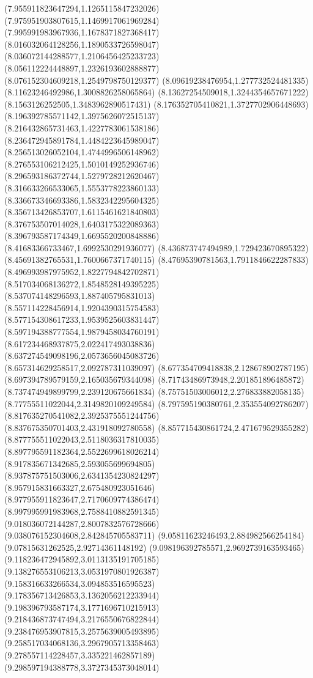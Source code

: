 {(7.955911823647294,1.1265115847232026)
(7.975951903807615,1.1469917061969284)
(7.995991983967936,1.1678371827368417)
(8.016032064128256,1.1890533726598047)
(8.036072144288577,1.2106456425233723)
(8.056112224448897,1.2326193602888877)
(8.076152304609218,1.2549798750129377)
(8.09619238476954,1.277732524481335)
(8.11623246492986,1.3008826258065864)
(8.13627254509018,1.3244354657671222)
(8.1563126252505,1.3483962890517431)
(8.176352705410821,1.3727702906448693)
(8.196392785571142,1.3975626072515137)
(8.216432865731463,1.4227783061538186)
(8.236472945891784,1.4484223645989047)
(8.256513026052104,1.4744996506148962)
(8.276553106212425,1.5010149252936746)
(8.296593186372744,1.5279728212620467)
(8.316633266533065,1.5553778223860133)
(8.336673346693386,1.5832342295604325)
(8.356713426853707,1.6115461621840803)
(8.376753507014028,1.6403175322089363)
(8.396793587174349,1.6695520200848886)
(8.41683366733467,1.6992530291936077)
(8.436873747494989,1.729423670895322)
(8.45691382765531,1.7600667371740115)
(8.47695390781563,1.7911846622287833)
(8.496993987975952,1.8227794842702871)
(8.517034068136272,1.8548528149395225)
(8.537074148296593,1.887405795831013)
(8.557114228456914,1.9204390315754583)
(8.577154308617233,1.9539525603831447)
(8.597194388777554,1.9879458034760191)
(8.617234468937875,2.022417493038836)
(8.637274549098196,2.0573656045083726)
(8.657314629258517,2.092787311039097)
(8.677354709418838,2.128678902787195)
(8.697394789579159,2.165035679344098)
(8.71743486973948,2.201851896485872)
(8.737474949899799,2.239120675661834)
(8.75751503006012,2.276833882058135)
(8.77755511022044,2.3149820109249584)
(8.797595190380761,2.353554092786207)
(8.817635270541082,2.3925375551244756)
(8.837675350701403,2.431918092780558)
(8.857715430861724,2.471679529355282)
(8.877755511022043,2.5118036317810035)
(8.897795591182364,2.5522699618026214)
(8.917835671342685,2.593055699694805)
(8.937875751503006,2.6341354230824297)
(8.957915831663327,2.675480923051646)
(8.977955911823647,2.7170609774386474)
(8.997995991983968,2.7588410882591345)
(9.018036072144287,2.8007832576728666)
(9.038076152304608,2.842845705583711)
(9.05811623246493,2.884982566254184)
(9.07815631262525,2.92714361148192)
(9.098196392785571,2.9692739163593465)
(9.118236472945892,3.0113135191705185)
(9.138276553106213,3.0531970801926387)
(9.158316633266534,3.094853516595523)
(9.178356713426853,3.1362056212233944)
(9.198396793587174,3.1771696710215913)
(9.218436873747494,3.2176550676822844)
(9.238476953907815,3.2575639005493895)
(9.258517034068136,3.2967905713358463)
(9.278557114228457,3.335221462857189)
(9.298597194388778,3.3727345373048014)
}
